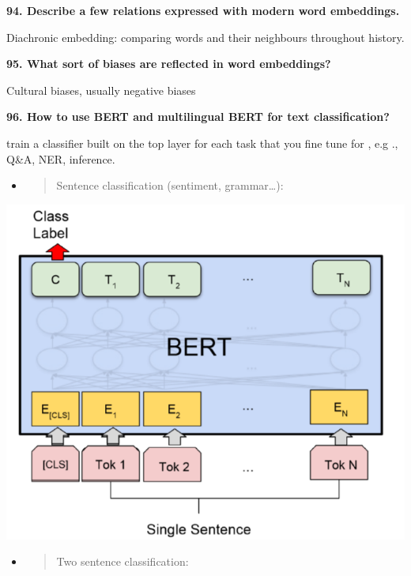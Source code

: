 \textbf{94. Describe a few relations expressed with modern word
embeddings.}

Diachronic embedding: comparing words and their neighbours throughout
history.

\textbf{95. What sort of biases are reflected in word embeddings?}

Cultural biases, usually negative biases

\textbf{96. How to use BERT and multilingual BERT for text
classification?}

train a classifier built on the top layer for each task that you fine
tune for , e.g ., Q\&A, NER, inference.

\begin{itemize}
\item
  \begin{quote}
  Sentence classification (sentiment, grammar\ldots):
  \end{quote}
\end{itemize}

\includegraphics[width=\columnwidth]{media/image13.png}

\begin{itemize}
\item
  \begin{quote}
  Two sentence classification:
  \end{quote}
\end{itemize}

